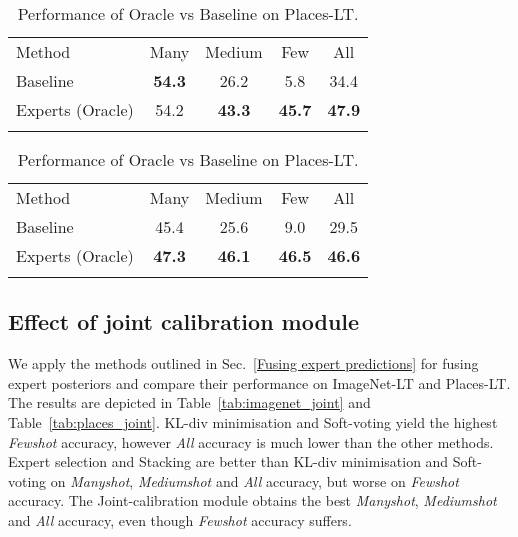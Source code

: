 \documentclass[runningheads]{llncs}
\begin{document}
\begin{table}[!]
\parbox{.48\linewidth}{
\small
\caption{Performance of Oracle vs Baseline on ImageNet-LT.}
\begin{tabular}{ l | c c c | c }
    \Xhline{4\arrayrulewidth}
    Method & Many & Medium & Few & All \\       \Xhline{4\arrayrulewidth}
    Baseline & \textbf{54.3} & 26.2 & 5.8 & 34.4 \\
    Experts (Oracle) & 54.2 & \textbf{43.3} & \textbf{45.7} & \textbf{47.9} \\  \Xhline{4\arrayrulewidth}
\end{tabular}
\label{tab:imagenet_oracle}
}
\hspace{2em}
\parbox{.45\linewidth}{
\small
\caption{Performance of Oracle vs Baseline on Places-LT.}
\begin{tabular}{ l | c c c | c }
    \Xhline{4\arrayrulewidth}
    Method & Many & Medium & Few & All \\       \Xhline{4\arrayrulewidth}
    Baseline & 45.4 & 25.6 & 9.0 & 29.5 \\
    Experts (Oracle) & \textbf{47.3} & \textbf{46.1} & \textbf{46.5} & \textbf{46.6} \\  \Xhline{4\arrayrulewidth}
\end{tabular}
\label{tab:places_oracle}
}
\end{table}

\subsection{Effect of joint calibration module}
We apply the methods outlined in Sec.~\ref{Fusing expert predictions} for fusing expert posteriors and compare their performance on ImageNet-LT and Places-LT. The results are depicted in Table~\ref{tab:imagenet_joint} and Table~\ref{tab:places_joint}. KL-div minimisation and Soft-voting yield the highest \emph{Fewshot} accuracy, however \emph{All} accuracy is much lower than the other methods. Expert selection and Stacking are better than KL-div minimisation and Soft-voting on \emph{Manyshot}, \emph{Mediumshot} and \emph{All} accuracy, but worse on \emph{Fewshot} accuracy. The Joint-calibration module obtains the best \emph{Manyshot}, \emph{Mediumshot} and \emph{All} accuracy, even though \emph{Fewshot} accuracy suffers.
\end{document}
